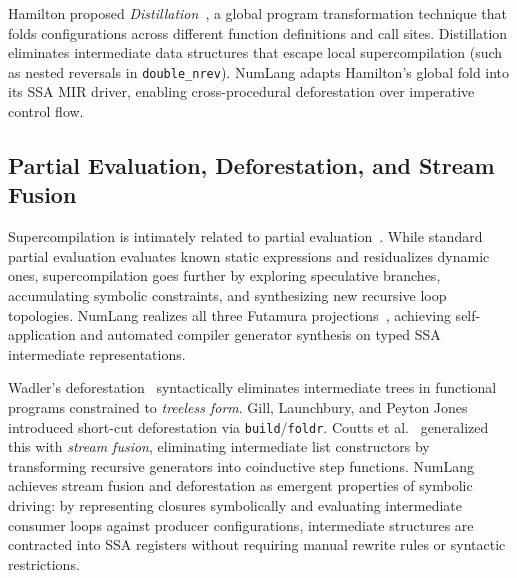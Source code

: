 Hamilton proposed \textit{Distillation}~\cite{hamilton2007distillation}, a global program transformation technique that folds configurations across different function definitions and call sites. Distillation eliminates intermediate data structures that escape local supercompilation (such as nested reversals in \texttt{double\_nrev}). NumLang adapts Hamilton's global fold into its SSA MIR driver, enabling cross-procedural deforestation over imperative control flow.

\subsection{Partial Evaluation, Deforestation, and Stream Fusion}
Supercompilation is intimately related to partial evaluation~\cite{jones1993partial}. While standard partial evaluation evaluates known static expressions and residualizes dynamic ones, supercompilation goes further by exploring speculative branches, accumulating symbolic constraints, and synthesizing new recursive loop topologies. NumLang realizes all three Futamura projections~\cite{futamura1971partial}, achieving self-application and automated compiler generator synthesis on typed SSA intermediate representations.

Wadler's deforestation~\cite{wadler1990deforestation} syntactically eliminates intermediate trees in functional programs constrained to \textit{treeless form}. Gill, Launchbury, and Peyton Jones introduced short-cut deforestation via \texttt{build}/\texttt{foldr}. Coutts et al.~\cite{coutts2007stream} generalized this with \textit{stream fusion}, eliminating intermediate list constructors by transforming recursive generators into coinductive step functions. NumLang achieves stream fusion and deforestation as emergent properties of symbolic driving: by representing closures symbolically and evaluating intermediate consumer loops against producer configurations, intermediate structures are contracted into SSA registers without requiring manual rewrite rules or syntactic restrictions.
